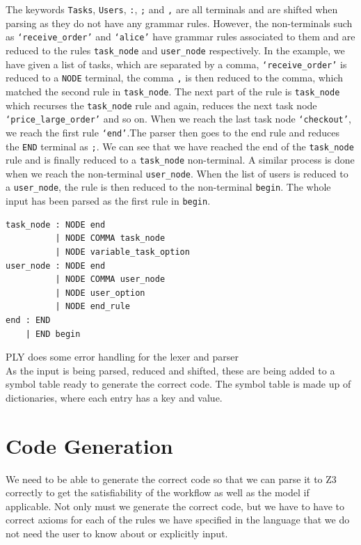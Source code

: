 \documentclass[a4paper]{report}
\begin{document}
The keywords \texttt{Tasks}, \texttt{Users}, \texttt{:}, \texttt{;} and \texttt{,} are all terminals and are shifted when parsing as they do not have any grammar rules. However, the non-terminals such as \texttt{`receive\_order'} and \texttt{`alice'} have grammar rules associated to them and are reduced to the rules \texttt{task\_node} and \texttt{user\_node} respectively. In the example, we have given a list of tasks, which are separated by a comma, \texttt{`receive\_order'} is reduced to a \texttt{NODE} terminal, the comma \texttt{,} is then reduced to the comma, which matched the second rule in \texttt{task\_node}. The next part of the rule is \texttt{task\_node} which recurses the \texttt{task\_node} rule and again, reduces the next task node \texttt{`price\_large\_order'} and so on. When we reach the last task node \texttt{`checkout'}, we reach the first rule \texttt{`end'}.The parser then goes to the end rule and reduces the \texttt{END} terminal as \texttt{;}. We can see that we have reached the end of the \texttt{task\_node} rule and is finally reduced to a \texttt{task\_node} non-terminal. A similar process is done when we reach the non-terminal \texttt{user\_node}. When the list of users is reduced to a \texttt{user\_node}, the rule is then reduced to the non-terminal \texttt{begin}. The whole input has been parsed as the first rule in \texttt{begin}.
\begin{lstlisting}[frame=single]
task_node : NODE end
          | NODE COMMA task_node
          | NODE variable_task_option
user_node : NODE end
          | NODE COMMA user_node
          | NODE user_option
          | NODE end_rule
end : END
    | END begin
\end{lstlisting}

PLY does some error handling for the lexer and parser\\

As the input is being parsed, reduced and shifted, these are being added to a symbol table ready to generate the correct code. The symbol table is made up of dictionaries, where each entry has a key and value.

\section{Code Generation}
We need to be able to generate the correct code so that we can parse it to Z3 correctly to get the satisfiability of the workflow as well as the model if applicable. Not only must we generate the correct code, but we have to have to correct axioms for each of the rules we have specified in the language that we do not need the user to know about or explicitly input.\\
\end{document}

